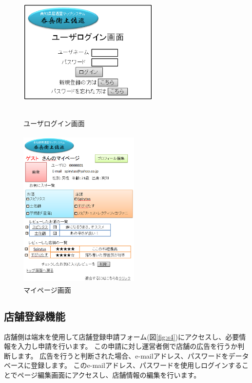 \documentclass[a4j,titlepage]{jarticle}
\begin{document}
\begin{figure}[htbp]
  \begin{center}
  \includegraphics [height=7cm, width=7cm]{extrnal1_design_document_image/s2.eps}
  \caption{ユーザログイン画面}
  \label {fig:s2}
  \end{center}
\end{figure}

\begin{figure}[htbp]
  \begin{center}
  \includegraphics [height=8cm, width=6cm]{extrnal1_design_document_image/s3.eps}
  \caption{マイページ画面}
  \label {fig:s3}
  \end{center}
\end{figure}

\newpage
\subsection{店舗登録機能}
店舗側は端末を使用して店舗登録申請フォーム(図\ref{fig:s4})にアクセスし、必要情報を入力し申請を行います。
この申請に対し運営者側で店舗の広告を行うか判断します。
広告を行うと判断された場合、e-mailアドレス、パスワードをデータベースに登録します。
このe-mailアドレス、パスワードを使用しログインすることでページ編集画面にアクセスし、店舗情報の編集を行います。
\end{document}
